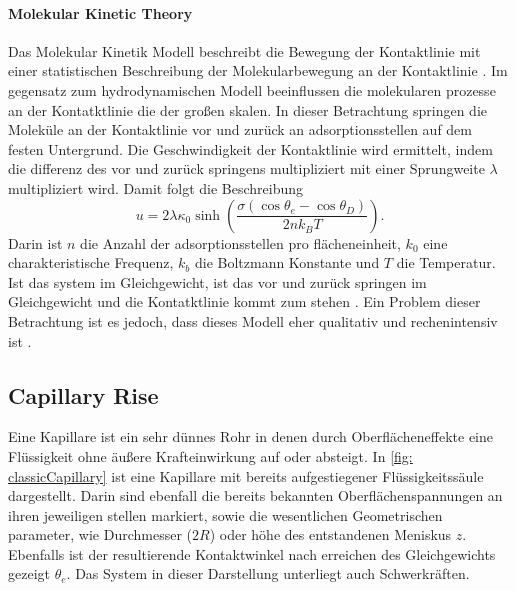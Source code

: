 \paragraph{Molekular Kinetic Theory}
Das Molekular Kinetik Modell beschreibt die Bewegung der Kontaktlinie mit einer statistischen Beschreibung der Molekularbewegung an der Kontaktlinie \cite{blake1969KineticsDisplacement}. 
Im gegensatz zum hydrodynamischen Modell beeinflussen die molekularen prozesse an der Kontatktlinie die der großen skalen. In dieser Betrachtung springen die Moleküle an der Kontaktlinie vor und zurück an adsorptionsstellen auf dem festen Untergrund. Die Geschwindigkeit der Kontaktlinie wird ermittelt, indem die differenz des vor und zurück springens multipliziert mit einer Sprungweite $\lambda$ multipliziert wird. Damit folgt die Beschreibung
\begin{equation}
    u=2\lambda\kappa_{0}\sinh\left(\frac{\sigma\left(\cos\theta_{e}-\cos\theta_{D}\right)}{2nk_{B}T}\right).
\end{equation}
Darin ist $n$ die Anzahl der adsorptionsstellen pro flächeneinheit, $k_0$ eine charakteristische Frequenz, $k_b$ die Boltzmann Konstante und $T$ die Temperatur.
Ist das system im Gleichgewicht, ist das vor und zurück springen im Gleichgewicht und die Kontatktlinie kommt zum stehen \cite{carlson2011DissipationRapidDynamic,blake2006PhysicsMovingWetting}. Ein Problem dieser Betrachtung ist es jedoch, dass dieses Modell eher qualitativ und rechenintensiv ist \cite{mohammadkarim2022ReviewPhysicsMoving}.







\subsection{Capillary Rise}
\label{sec: CapillaryRise}

Eine Kapillare ist ein sehr dünnes Rohr in denen durch Oberflächeneffekte eine Flüssigkeit ohne äußere Krafteinwirkung auf oder absteigt. In \ref{fig: classicCapillary} ist eine Kapillare mit bereits aufgestiegener Flüssigkeitssäule dargestellt. Darin sind ebenfall die bereits bekannten Oberflächenspannungen an ihren jeweiligen stellen markiert, sowie die wesentlichen Geometrischen parameter, wie Durchmesser ($2R$) oder höhe des entstandenen Meniskus $z$. Ebenfalls ist der resultierende Kontaktwinkel nach erreichen des Gleichgewichts gezeigt $\theta_e$. Das System in dieser Darstellung unterliegt auch Schwerkräften. 


